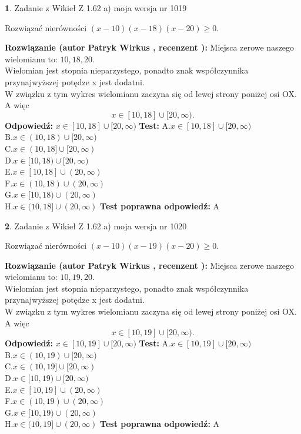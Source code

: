 \documentclass[12pt, a4paper]{article}
\theoremstyle{definition} %
\newtheorem{zad}{}
\newcommand{\zadStart}[1]{\begin{zad}#1\newline}
\newcommand{\zadStop}{\end{zad}}
\newcommand{\rozwStart}[2]{\noindent \textbf{Rozwiązanie (autor #1 , recenzent #2): }\newline}
\newcommand{\rozwStop}{\newline}
\newcommand{\odpStart}{\noindent \textbf{Odpowiedź:}\newline}
\newcommand{\odpStop}{\newline}
\newcommand{\testStart}{\noindent \textbf{Test:}\newline}
\newcommand{\testStop}{\newline}
\newcommand{\kluczStart}{\noindent \textbf{Test poprawna odpowiedź:}\newline}
\newcommand{\kluczStop}{\newline}
\begin{document}
\zadStart{Zadanie z Wikieł Z 1.62 a) moja wersja nr 1019}

Rozwiązać nierówności $(x-10)(x-18)(x-20)\ge0$.
\zadStop
\rozwStart{Patryk Wirkus}{}
Miejsca zerowe naszego wielomianu to: $10, 18, 20$.\\
Wielomian jest stopnia nieparzystego, ponadto znak współczynnika przy\linebreak najwyższej potędze x jest dodatni.\\ W związku z tym wykres wielomianu zaczyna się od lewej strony poniżej osi OX. A więc $$x \in [10,18] \cup [20,\infty).$$
\rozwStop
\odpStart
$x \in [10,18] \cup [20,\infty)$
\odpStop
\testStart
A.$x \in [10,18] \cup [20,\infty)$\\
B.$x \in (10,18) \cup [20,\infty)$\\
C.$x \in (10,18] \cup [20,\infty)$\\
D.$x \in [10,18) \cup [20,\infty)$\\
E.$x \in [10,18] \cup (20,\infty)$\\
F.$x \in (10,18) \cup (20,\infty)$\\
G.$x \in [10,18) \cup (20,\infty)$\\
H.$x \in (10,18] \cup (20,\infty)$
\testStop
\kluczStart
A
\kluczStop



\zadStart{Zadanie z Wikieł Z 1.62 a) moja wersja nr 1020}

Rozwiązać nierówności $(x-10)(x-19)(x-20)\ge0$.
\zadStop
\rozwStart{Patryk Wirkus}{}
Miejsca zerowe naszego wielomianu to: $10, 19, 20$.\\
Wielomian jest stopnia nieparzystego, ponadto znak współczynnika przy\linebreak najwyższej potędze x jest dodatni.\\ W związku z tym wykres wielomianu zaczyna się od lewej strony poniżej osi OX. A więc $$x \in [10,19] \cup [20,\infty).$$
\rozwStop
\odpStart
$x \in [10,19] \cup [20,\infty)$
\odpStop
\testStart
A.$x \in [10,19] \cup [20,\infty)$\\
B.$x \in (10,19) \cup [20,\infty)$\\
C.$x \in (10,19] \cup [20,\infty)$\\
D.$x \in [10,19) \cup [20,\infty)$\\
E.$x \in [10,19] \cup (20,\infty)$\\
F.$x \in (10,19) \cup (20,\infty)$\\
G.$x \in [10,19) \cup (20,\infty)$\\
H.$x \in (10,19] \cup (20,\infty)$
\testStop
\kluczStart
A
\kluczStop
\end{document}
